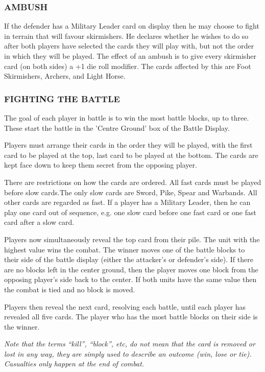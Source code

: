 \subsubsection{AMBUSH}

If the defender has a Military Leader card on display then he may choose to fight in terrain that will favour skirmishers. He declares whether he wishes to do so after both players have selected the cards they will play with, but not the order in which they will be played. The effect of an ambush is to give every skirmisher card (on both sides) a +1 die roll modifier. The cards affected by this are Foot Skirmishers, Archers, and Light Horse.

\subsubsection{FIGHTING THE BATTLE}

The goal of each player in battle is to win the most battle blocks, up to three. These start the battle in the 'Centre Ground’ box of  the Battle Display.

Players must arrange their cards in the order they will be played, with the first card to be played at the top, last card to be played at the bottom. The cards are kept face down to keep them secret from the opposing player.

There are restrictions on how the cards are ordered. All fast cards must be played before slow cards.The only slow cards are Sword, Pike, Spear and Warbands. All other cards are regarded as fast. If a player has a Military Leader, then he can play one card out of sequence, e.g. one slow card before one fast card or one fast card after a slow card.

Players now simultaneously reveal the top card from their pile. The unit with the highest value wins the combat. The winner moves one of the battle blocks to their side of the battle display (either the attacker's or defender's side). If there are no blocks left in the center ground, then the player moves one block from the opposing player's side back to the center. If both units have the same value then the combat is tied and no block is moved.

Players then reveal the next card, resolving each battle, until each player has revealed all five cards. The player who has the most battle blocks on their side is the winner.

\textit{Note that the terms “kill”, “block”, etc, do not mean that the card is removed or lost in any way, they are simply used to describe an outcome (win, lose or tie). Casualties only happen at the end of combat.}

